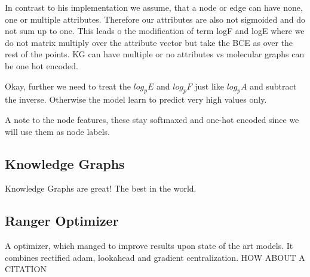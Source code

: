 In contrast to his implementation we assume, that a node or edge can have none, one or multiple attributes. Therefore our attributes are also not sigmoided and do not sum up to one. This leads o the modification of term logF and logE where we do not matrix multiply over the attribute vector but take the BCE as over the rest of the points.
KG can have multiple or no attributes vs molecular graphs can be one hot encoded.

Okay, further we need to treat the $log_pE$ and $log_pF$ just like $log_pA$ and subtract the inverse. Otherwise the model learn to predict very high values only. 

A note to the node features, these stay softmaxed and one-hot encoded since we will use them as node labels.

\subsection{Knowledge Graphs}

Knowledge Graphs are great! The best in the world.












\subsection{Ranger Optimizer}
A optimizer, which manged to improve results upon state of the art models. It combines rectified adam, lookahead and gradient centralization.
HOW ABOUT A CITATION
